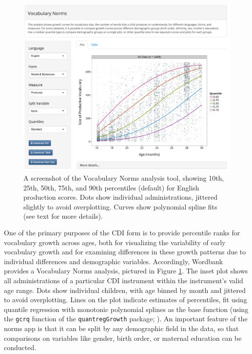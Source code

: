 \documentclass[man,noapacite]{apa}
\begin{document}
\begin{figure}[h!]
\includegraphics[width=6in]{figures/normsapp.png}
\caption{\label{fig:norms} A screenshot of the Vocabulary Norms analysis tool, showing 10th, 25th, 50th, 75th, and 90th percentiles (default) for English production scores. Dots show individual administrations, jittered slightly to avoid overplotting. Curves show polynomial spline fits (see text for more details).}
\end{figure}

One of the primary purposes of the CDI form is to provide percentile ranks for vocabulary growth across ages, both for visualizing the variability of early vocabulary growth and for examining differences in these growth patterns due to individual differences and demographic variables. Accordingly, Wordbank provides a Vocabulary Norms analysis, pictured in Figure \ref{fig:norms}. The inset plot shows all administrations of a particular CDI instrument within the instrument's valid age range. Dots show individual children, with age binned by month and jittered to avoid overplotting. Lines on the plot indicate estimates of percentiles, fit using quantile regression with monotonic polynomial splines as the base function (using the \texttt{gcrq} function of the \texttt{quantregGrowth} package; ). An important feature of the norms app is that it can be split by any demographic field in the data, so that comparisons on variables like gender, birth order, or maternal education can be conducted. 
\end{document}
